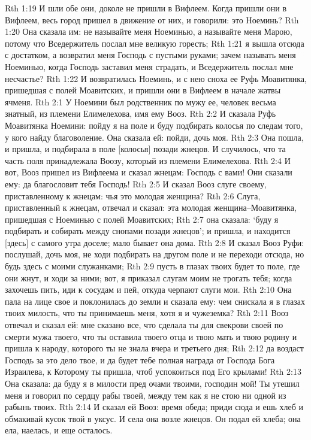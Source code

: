Rth 1:19  И шли обе они, доколе не пришли в Вифлеем. Когда пришли они в Вифлеем, весь город пришел в движение от них, и говорили: это Ноеминь?
Rth 1:20  Она сказала им: не называйте меня Ноеминью, а называйте меня Марою, потому что Вседержитель послал мне великую горесть;
Rth 1:21  я вышла отсюда с достатком, а возвратил меня Господь с пустыми руками; зачем называть меня Ноеминью, когда Господь заставил меня страдать, и Вседержитель послал мне несчастье?
Rth 1:22  И возвратилась Ноеминь, и с нею сноха ее Руфь Моавитянка, пришедшая с полей Моавитских, и пришли они в Вифлеем в начале жатвы ячменя.
Rth 2:1  У Ноемини был родственник по мужу ее, человек весьма знатный, из племени Елимелехова, имя ему Вооз.
Rth 2:2  И сказала Руфь Моавитянка Ноемини: пойду я на поле и буду подбирать колосья по следам того, у кого найду благоволение. Она сказала ей: пойди, дочь моя.
Rth 2:3  Она пошла, и пришла, и подбирала в поле [колосья] позади жнецов. И случилось, что та часть поля принадлежала Воозу, который из племени Елимелехова.
Rth 2:4  И вот, Вооз пришел из Вифлеема и сказал жнецам: Господь с вами! Они сказали ему: да благословит тебя Господь!
Rth 2:5  И сказал Вооз слуге своему, приставленному к жнецам: чья это молодая женщина?
Rth 2:6  Слуга, приставленный к жнецам, отвечал и сказал: эта молодая женщина--Моавитянка, пришедшая с Ноеминью с полей Моавитских;
Rth 2:7  она сказала: `буду я подбирать и собирать между снопами позади жнецов'; и пришла, и находится [здесь] с самого утра доселе; мало бывает она дома.
Rth 2:8  И сказал Вооз Руфи: послушай, дочь моя, не ходи подбирать на другом поле и не переходи отсюда, но будь здесь с моими служанками;
Rth 2:9  пусть в глазах твоих будет то поле, где они жнут, и ходи за ними; вот, я приказал слугам моим не трогать тебя; когда захочешь пить, иди к сосудам и пей, откуда черпают слуги мои.
Rth 2:10  Она пала на лице свое и поклонилась до земли и сказала ему: чем снискала я в глазах твоих милость, что ты принимаешь меня, хотя я и чужеземка?
Rth 2:11  Вооз отвечал и сказал ей: мне сказано все, что сделала ты для свекрови своей по смерти мужа твоего, что ты оставила твоего отца и твою мать и твою родину и пришла к народу, которого ты не знала вчера и третьего дня;
Rth 2:12  да воздаст Господь за это дело твое, и да будет тебе полная награда от Господа Бога Израилева, к Которому ты пришла, чтоб успокоиться под Его крылами!
Rth 2:13  Она сказала: да буду я в милости пред очами твоими, господин мой! Ты утешил меня и говорил по сердцу рабы твоей, между тем как я не стою ни одной из рабынь твоих.
Rth 2:14  И сказал ей Вооз: время обеда; приди сюда и ешь хлеб и обмакивай кусок твой в уксус. И села она возле жнецов. Он подал ей хлеба; она ела, наелась, и еще осталось.
